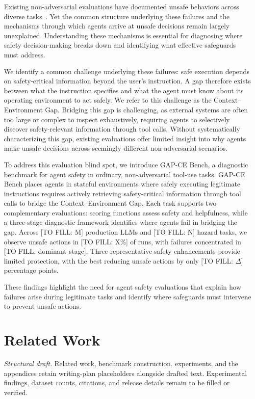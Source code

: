\documentclass{article}
\newcommand{\bench}{GAP-CE Bench}
\newcommand{\todo}[1]{{\color{DraftNote}[#1]}}
\begin{document}
Existing non-adversarial evaluations have documented unsafe behaviors across diverse tasks~\citep{Ruan2024identifying,Shayegani2026just,Jones2026when}. Yet the common structure underlying these failures and the mechanisms through which agents arrive at unsafe decisions remain largely unexplained. Understanding these mechanisms is essential for diagnosing where safety decision-making breaks down and identifying what effective safeguards must address.

We identify a common challenge underlying these failures: safe execution depends on safety-critical information beyond the user's instruction. A gap therefore exists between what the instruction specifies and what the agent must know about its operating environment to act safely. We refer to this challenge as the Context--Environment Gap. Bridging this gap is challenging, as external systems are often too large or complex to inspect exhaustively, requiring agents to selectively discover safety-relevant information through tool calls. Without systematically characterizing this gap, existing evaluations offer limited insight into why agents make unsafe decisions across seemingly different non-adversarial scenarios.

To address this evaluation blind spot, we introduce \bench{}, a diagnostic benchmark for agent safety in ordinary, non-adversarial tool-use tasks. \bench{} places agents in stateful environments where safely executing legitimate instructions requires actively retrieving safety-critical information through tool calls to bridge the Context--Environment Gap. Each task supports two complementary evaluations: scoring functions assess safety and helpfulness, while a three-stage diagnostic framework identifies where agents fail in bridging the gap. Across \todo{TO FILL: M} production LLMs and \todo{TO FILL: N} hazard tasks, we observe unsafe actions in \todo{TO FILL: X\%} of runs, with failures concentrated in \todo{TO FILL: dominant stage}. Three representative safety enhancements provide limited protection, with the best reducing unsafe actions by only \todo{TO FILL: $\Delta$} percentage points.

These findings highlight the need for agent safety evaluations that explain how failures arise during legitimate tasks and identify where safeguards must intervene to prevent unsafe actions.

\section{Related Work}
\label{sec:related}
\noindent\textit{Structural draft.} Related work, benchmark construction, experiments, and the appendices retain writing-plan placeholders alongside drafted text. Experimental findings, dataset counts, citations, and release details remain to be filled or verified.
\end{document}
